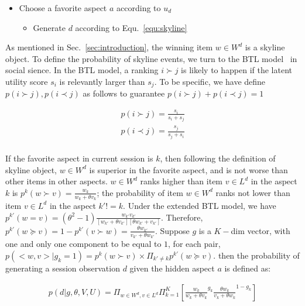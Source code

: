 \documentclass[sigconf]{acmart}
\begin{document}
\begin{itemize}
	\item Choose a favorite aspect $a$ according to $u_d$
	
	\begin{itemize}
		\item Generate $d$ according to Equ.~\ref{equ:skyline}  
	\end{itemize}
\end{itemize}
  
As mentioned in Sec.~\ref{sec:introduction}, the winning item $w\in W^d$ is a skyline object. To define the probability of skyline events, we turn to the BTL model~\cite{Hunter2004MM} in social sience. In the BTL model, a ranking $i \succ j$ is likely to happen if the latent utility score $s_i$ is relevantly larger than $s_j$. To be specific, we have define $p(i \succ j), p(i \prec j)$ as follows to guarantee $p(i \succ j)+ p(i \prec j) =1$


\begin{align*}
	p(i \succ j)=\frac{s_i}{s_i+ s_j} \\
	p(i \prec j)=\frac{s_j}{s_j+ s_i} \\
\end{align*}
  
If the favorite aspect in current session is $k$, then following the definition of skyline object, $w\in W^d$ is superior in the favorite aspect,  and is not worse than other items in other aspects. $w\in W^d$ ranks higher than item $v\in L^d$ in the aspect $k$ is $p^k(w \succ v)=\frac{w_k}{w_k+\theta v_k}$; the probability of item $w\in W^d$ ranks not lower than item $v\in L^d$ in the aspect $k'!=k$. Under the extended BTL model, we have$p^{k'}(w = v)=(\theta^2-1)\frac{w_{k'}v_{k'}}{[w_{k'}+\theta v_{k'}][\theta w_{k'}+ v_{k'}]}$. Therefore, $p^{k'}(w \succeq v)=1- p^{k'} (v \succ w) = \frac{\theta w_{k'}}{v_{k'}+\theta w_{k'}}$. Suppose $g$ is a $K-$dim vector, with one and only one component to be equal to $1$, for each pair, $p(<w,v>|g_k=1) = p^k(w\succ v) \times \Pi_{k'\neq k} p^{k'}(w \succeq v)$. then the probability of generating a session observation $d$ given the hidden aspect $a$ is defined as:  

\begin{align}\label{equ:skyline}
		p(d|g,\theta,V,U) %
		=\Pi_{w\in W^d, v\in L^d} \Pi_{k=1}^{K}[ {\frac{w_k}{w_k+\theta v_k}}^{g_k} { \frac{\theta w_{k}}{v_{k}+\theta w_{k}}}^{1-g_k}]
\end{align}
\end{document}
